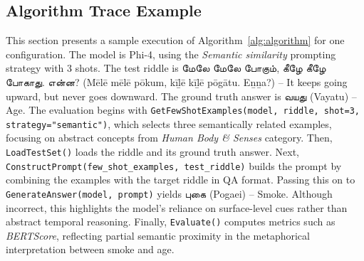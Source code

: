 \documentclass[11pt]{article}
\begin{document}
\subsection{Algorithm Trace Example}
This section presents a sample execution of Algorithm~\ref{alg:algorithm} for one configuration. The model is Phi-4, using the \textit{Semantic similarity} prompting strategy with 3 shots. The test riddle is {\tam மேலே மேலே போகும், கீழே கீழே போகாது. என்ன?} (Mēlē mēlē pōkum, kīḻē kīḻē pōgātu. Eṉṉa?) – It keeps going upward, but never goes downward. The ground truth answer is {\tam வயது} (Vayatu) – Age. The evaluation begins with \texttt{GetFewShotExamples(model, riddle, shot=3, strategy="semantic")}, which selects three semantically related examples, focusing on abstract concepts from \textit{Human Body \& Senses} category. Then, \texttt{LoadTestSet()} loads the riddle and its ground truth answer.  Next, \texttt{ConstructPrompt(few\_shot\_examples, test\_riddle)} builds the prompt by combining the examples with the target riddle in QA format. Passing this on to \texttt{GenerateAnswer(model, prompt)} yields {\tam புகை} (Pogaei) – Smoke. Although incorrect, this highlights the model’s reliance on surface-level cues rather than abstract temporal reasoning. Finally, \texttt{Evaluate()} computes metrics such as \textit{BERTScore}, reflecting partial semantic proximity in the metaphorical interpretation between smoke and age.
\end{document}
